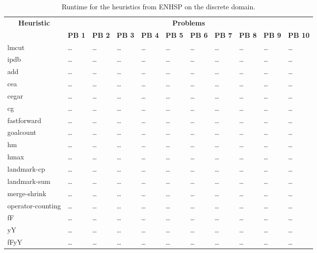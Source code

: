 \begin{sidewaystable}
    \centering
    \caption{Runtime for the heuristics from ENHSP on the discrete domain.}\label{tab:discrete-experiment-results}
    \begin{tabular}{p{3cm} *{10}{p{1.523cm}}}
        \toprule
        \multicolumn{1}{c}{\textbf{Heuristic}} & \multicolumn{10}{c}{\textbf{Problems}} \\
        \cmidrule(lr){2-11}
        & \textbf{PB 1} & \textbf{PB 2} & \textbf{PB 3} & \textbf{PB 4} & \textbf{PB 5} & \textbf{PB 6} & \textbf{PB 7} & \textbf{PB 8} & \textbf{PB 9} & \textbf{PB 10} \\
        \midrule
        lmcut & \dots & \dots & \dots & \dots & \dots & \dots & \dots & \dots & \dots & \dots \\
        ipdb & \dots & \dots & \dots & \dots & \dots & \dots & \dots & \dots & \dots & \dots \\
        add & \dots & \dots & \dots & \dots & \dots & \dots & \dots & \dots & \dots & \dots \\
        cea & \dots & \dots & \dots & \dots & \dots & \dots & \dots & \dots & \dots & \dots \\
        cegar & \dots & \dots & \dots & \dots & \dots & \dots & \dots & \dots & \dots & \dots \\
        cg & \dots & \dots & \dots & \dots & \dots & \dots & \dots & \dots & \dots & \dots \\
        fastforward & \dots & \dots & \dots & \dots & \dots & \dots & \dots & \dots & \dots & \dots \\
        goalcount & \dots & \dots & \dots & \dots & \dots & \dots & \dots & \dots & \dots & \dots \\
        hm & \dots & \dots & \dots & \dots & \dots & \dots & \dots & \dots & \dots & \dots \\
        hmax & \dots & \dots & \dots & \dots & \dots & \dots & \dots & \dots & \dots & \dots \\
        landmark-cp & \dots & \dots & \dots & \dots & \dots & \dots & \dots & \dots & \dots & \dots \\
        landmark-sum & \dots & \dots & \dots & \dots & \dots & \dots & \dots & \dots & \dots & \dots \\
        merge-shrink & \dots & \dots & \dots & \dots & \dots & \dots & \dots & \dots & \dots & \dots \\
        operator-counting & \dots & \dots & \dots & \dots & \dots & \dots & \dots & \dots & \dots & \dots \\
        fF & \dots & \dots & \dots & \dots & \dots & \dots & \dots & \dots & \dots & \dots \\
        yY & \dots & \dots & \dots & \dots & \dots & \dots & \dots & \dots & \dots & \dots \\
        fFyY & \dots & \dots & \dots & \dots & \dots & \dots & \dots & \dots & \dots & \dots \\
        \bottomrule
    \end{tabular}
\end{sidewaystable}
